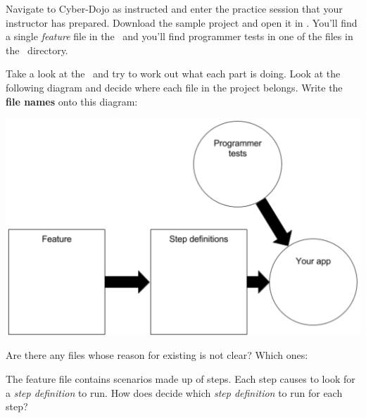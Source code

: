 \fi 

\ifcontent 
    \CYBERDOJO
    {Navigate to Cyber-Dojo as instructed and enter the practice session that your instructor has prepared.}
    {Download the sample project and open it in . You'll find a single \emph{feature} file in the \ and you'll find programmer tests in one of the files in the \ directory.}
    
    Take a look at the \ and try to work out what each part is doing. Look at the following diagram and decide where each file in the project belongs. Write the \textbf{file names} onto this diagram:
    
    \begin{center}
    \includegraphics[width=.9\textwidth]{images/cucumber-anatomy}
    \end{center}
    
    Are there any files whose reason for existing is not clear? Which ones:
    
    
    The feature file contains scenarios made up of steps. Each step causes \CUKE{} to look for a {\workbookLanguage } \emph{step definition} to run. How does \CUKE{} decide which \emph{step definition} to run for each step?
    
    
\fi